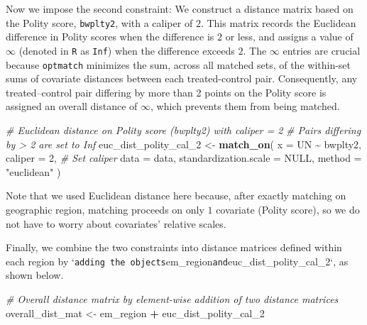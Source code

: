 \documentclass[
  12pt,
  leqno]{article}
\newenvironment{Shaded}{\begin{snugshade}}{\end{snugshade}}
\newcommand{\AttributeTok}[1]{\textcolor[rgb]{0.13,0.29,0.53}{#1}}
\newcommand{\CommentTok}[1]{\textcolor[rgb]{0.56,0.35,0.01}{\textit{#1}}}
\newcommand{\ConstantTok}[1]{\textcolor[rgb]{0.56,0.35,0.01}{#1}}
\newcommand{\DecValTok}[1]{\textcolor[rgb]{0.00,0.00,0.81}{#1}}
\newcommand{\FunctionTok}[1]{\textcolor[rgb]{0.13,0.29,0.53}{\textbf{#1}}}
\newcommand{\NormalTok}[1]{#1}
\newcommand{\OtherTok}[1]{\textcolor[rgb]{0.56,0.35,0.01}{#1}}
\newcommand{\SpecialCharTok}[1]{\textcolor[rgb]{0.81,0.36,0.00}{\textbf{#1}}}
\newcommand{\StringTok}[1]{\textcolor[rgb]{0.31,0.60,0.02}{#1}}
\begin{document}
\doublespacing

Now we impose the second constraint: We construct a distance matrix
based on the Polity score, \texttt{bwplty2}, with a caliper of \(2\).
This matrix records the Euclidean difference in Polity scores when the
difference is \(2\) or less, and assigns a value of \(\infty\) (denoted
in \texttt{R} as \texttt{Inf}) when the difference exceeds \(2\). The
\(\infty\) entries are crucial because \texttt{optmatch} minimizes the
sum, across all matched sets, of the within-set sums of covariate
distances between each treated-control pair. Consequently, any
treated--control pair differing by more than 2 points on the Polity
score is assigned an overall distance of \(\infty\), which prevents them
from being matched.

\singlespacing

\begin{Shaded}
\begin{Highlighting}[]
\CommentTok{\# Euclidean distance on Polity score (bwplty2) with caliper = 2}
\CommentTok{\# Pairs differing by \textgreater{} 2 are set to Inf}
\NormalTok{euc\_dist\_polity\_cal\_2 }\OtherTok{\textless{}{-}} \FunctionTok{match\_on}\NormalTok{(}
  \AttributeTok{x =}\NormalTok{ UN }\SpecialCharTok{\textasciitilde{}}\NormalTok{ bwplty2,}
  \AttributeTok{caliper =} \DecValTok{2}\NormalTok{,  }\CommentTok{\# Set caliper}
  \AttributeTok{data =}\NormalTok{ data,}
  \AttributeTok{standardization.scale =} \ConstantTok{NULL}\NormalTok{,}
  \AttributeTok{method =} \StringTok{"euclidean"}
\NormalTok{)}
\end{Highlighting}
\end{Shaded}

\doublespacing

Note that we used Euclidean distance here because, after exactly
matching on geographic region, matching proceeds on only \(1\) covariate
(Polity score), so we do not have to worry about covariates' relative
scales.

Finally, we combine the two constraints into distance matrices defined
within each region by
`\texttt{adding\textquotesingle{}\textquotesingle{}\ the\ objects}em\_region\texttt{and}euc\_dist\_polity\_cal\_2`,
as shown below.

\singlespacing

\begin{Shaded}
\begin{Highlighting}[]
\CommentTok{\# Overall distance matrix by element{-}wise addition of two distance matrices}
\NormalTok{overall\_dist\_mat }\OtherTok{\textless{}{-}}\NormalTok{ em\_region }\SpecialCharTok{+}\NormalTok{ euc\_dist\_polity\_cal\_2}
\end{Highlighting}
\end{Shaded}
\end{document}
